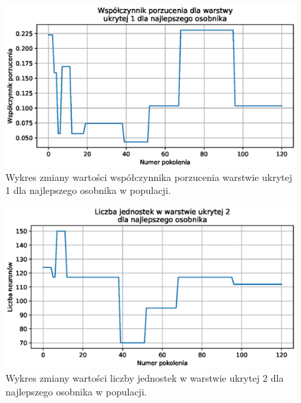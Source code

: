 \documentclass[a4paper,12pt]{article}
\numberwithin{figure}{section}
\begin{document}
    \smallskip

    \begin{figure}[H]
        \centering
        \includegraphics[width=\textwidth]{g_a_best_hidden_1_dropout_rate}
        \caption{Wykres zmiany wartości współczynnika porzucenia warstwie ukrytej 1 dla najlepszego osobnika w populacji.}
        \label{fig:g_a_best_hidden_1_dropout_rate}
    \end{figure}

    \smallskip

    \begin{figure}[H]
        \centering
        \includegraphics[width=\textwidth]{g_a_best_hidden_2_units}
        \caption{Wykres zmiany wartości liczby jednostek w warstwie ukrytej 2 dla najlepszego osobnika w populacji.}
        \label{fig:g_a_best_hidden_2_units}
    \end{figure}

    \smallskip
\end{document}

